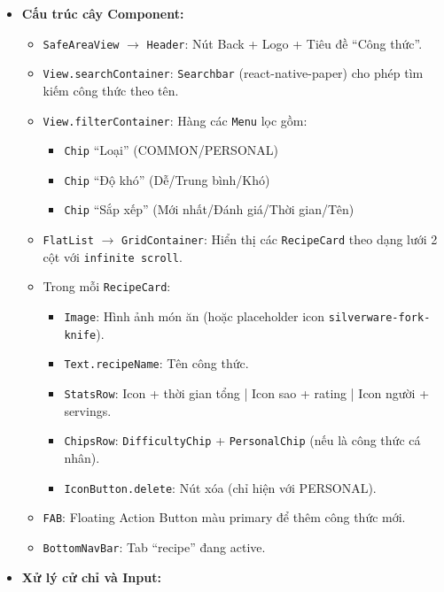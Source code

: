 \begin{itemize}
    \item \textbf{Cấu trúc cây Component:}
        \begin{itemize}
            \item \texttt{SafeAreaView} $\rightarrow$ \texttt{Header}: Nút Back + Logo + Tiêu đề ``Công thức''.
            \item \texttt{View.searchContainer}: \texttt{Searchbar} (react-native-paper) cho phép tìm kiếm công thức theo tên.
            \item \texttt{View.filterContainer}: Hàng các \texttt{Menu} lọc gồm:
                \begin{itemize}
                    \item \texttt{Chip} ``Loại'' (COMMON/PERSONAL)
                    \item \texttt{Chip} ``Độ khó'' (Dễ/Trung bình/Khó)
                    \item \texttt{Chip} ``Sắp xếp'' (Mới nhất/Đánh giá/Thời gian/Tên)
                \end{itemize}
            \item \texttt{FlatList} $\rightarrow$ \texttt{GridContainer}: Hiển thị các \texttt{RecipeCard} theo dạng lưới 2 cột với \texttt{infinite scroll}.
            \item Trong mỗi \texttt{RecipeCard}:
                \begin{itemize}
                    \item \texttt{Image}: Hình ảnh món ăn (hoặc placeholder icon \texttt{silverware-fork-knife}).
                    \item \texttt{Text.recipeName}: Tên công thức.
                    \item \texttt{StatsRow}: Icon + thời gian tổng | Icon sao + rating | Icon người + servings.
                    \item \texttt{ChipsRow}: \texttt{DifficultyChip} + \texttt{PersonalChip} (nếu là công thức cá nhân).
                    \item \texttt{IconButton.delete}: Nút xóa (chỉ hiện với PERSONAL).
                \end{itemize}
            \item \texttt{FAB}: Floating Action Button màu primary để thêm công thức mới.
            \item \texttt{BottomNavBar}: Tab ``recipe'' đang active.
        \end{itemize}
    \item \textbf{Xử lý cử chỉ và Input:}

\end{itemize}
